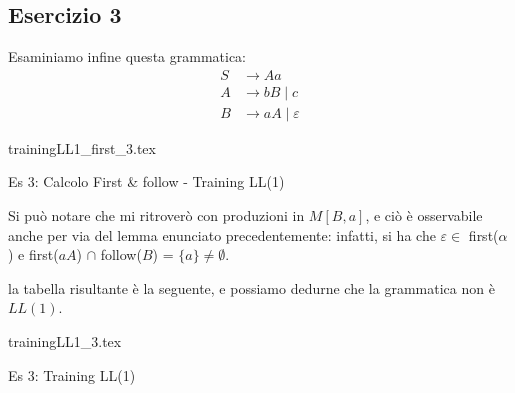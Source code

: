 \documentclass[class=book, crop=false, oneside, 12pt]{standalone}
\begin{document}
\subsection*{Esercizio 3}
Esaminiamo infine questa grammatica:
\begin{align*}
    S &\rightarrow Aa \\
    A &\rightarrow bB \mid c \\
    B &\rightarrow aA \mid \varepsilon
\end{align*}
\begin{table}[h]
    \centering
    {trainingLL1_first_3.tex}
    \caption{Es 3: Calcolo First \& follow - Training LL(1)}
    \label{trainingLL1_first_3}
\end{table}
Si può notare che mi ritroverò con produzioni in \(M[B, a]\), e ciò è osservabile anche per via del lemma enunciato precedentemente: infatti, si ha che \(\varepsilon \in\) first(\(\alpha\)) e first(\(aA\)) \(\cap\) follow(\(B\)) = \(\{a\} \neq \emptyset\).

la tabella risultante è la seguente, e possiamo dedurne che la grammatica non è \(LL(1)\).
\begin{table}[h]
    \centering
	{trainingLL1_3.tex}
    \caption{Es 3: Training LL(1)}
    \label{trainingLL1_3}
\end{table}
\end{document}
